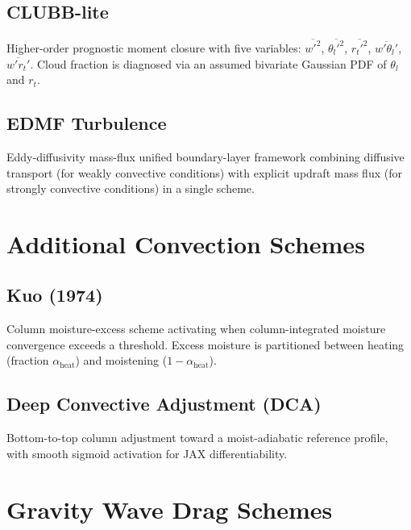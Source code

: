 \documentclass[11pt,twoside]{report}
\begin{document}
\subsection{CLUBB-lite}
Higher-order prognostic moment closure with five variables:
$\overline{w'^2}$, $\overline{\theta_l'^2}$, $\overline{r_t'^2}$,
$\overline{w'\theta_l'}$, $\overline{w'r_t'}$.
Cloud fraction is diagnosed via an assumed bivariate Gaussian PDF of
$\theta_l$ and $r_t$.

\subsection{EDMF Turbulence}
Eddy-diffusivity mass-flux unified boundary-layer framework combining
diffusive transport (for weakly convective conditions) with explicit
updraft mass flux (for strongly convective conditions) in a single scheme.

\section{Additional Convection Schemes}

\subsection{Kuo (1974)}
Column moisture-excess scheme activating when column-integrated moisture
convergence exceeds a threshold.  Excess moisture is partitioned between
heating (fraction $\alpha_{\mathrm{heat}}$) and moistening
($1-\alpha_{\mathrm{heat}}$).

\subsection{Deep Convective Adjustment (DCA)}
Bottom-to-top column adjustment toward a moist-adiabatic reference profile,
with smooth sigmoid activation for JAX differentiability.

\section{Gravity Wave Drag Schemes}
\end{document}
